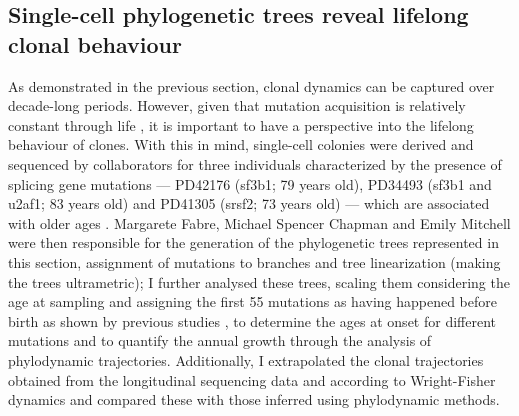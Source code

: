 \begin{figure}[!ht]
	\label{fig:ch-variance-uc-technical}
\end{figure}

\begin{figure}[!ht]
	\label{fig:ch-variance-uc-biological}
\end{figure}

\subsection{Single-cell phylogenetic trees reveal lifelong clonal behaviour}

As demonstrated in the previous section, clonal dynamics can be captured over decade-long periods. However, given that mutation acquisition is relatively constant through life \cite{Abascal_2021_gjvqfm}, it is important to have a perspective into the lifelong behaviour of clones. With this in mind, single-cell colonies were derived and sequenced by collaborators for three individuals characterized by the presence of splicing gene mutations --- PD42176 (\ac{sf3b1}; 79 years old), PD34493 (\ac{sf3b1} and \ac{u2af1}; 83 years old) and PD41305 (\ac{srsf2}; 73 years old) --- which are associated with older ages \cite{McKerrell2015-rl}. Margarete Fabre, Michael Spencer Chapman and Emily Mitchell were then responsible for the generation of the phylogenetic trees represented in this section, assignment of mutations to branches and tree linearization (making the trees ultrametric); I further analysed these trees, scaling them considering the age at sampling and assigning the first 55 mutations as having happened before birth as shown by previous studies \cite{Mitchell2021-zl}, to determine the ages at onset for different mutations and to quantify the annual growth through the analysis of phylodynamic trajectories. Additionally, I extrapolated the clonal trajectories obtained from the longitudinal sequencing data and according to Wright-Fisher dynamics and compared these with those inferred using phylodynamic methods.

